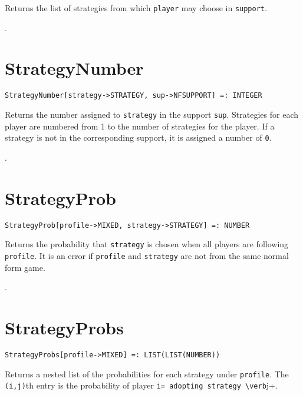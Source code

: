 \noindent
Returns the list of strategies from which  \verb+player+ may choose
in \verb+support+.

\seealso {}.


\section*{StrategyNumber}\label{PrimStrategyNumber}
\begin{verbatim}
StrategyNumber[strategy->STRATEGY, sup->NFSUPPORT] =: INTEGER
\end{verbatim}

\noindent
Returns the number assigned to \verb+strategy+ in the support
\verb+sup+.  Strategies  for each player are numbered from 1 to
the number of strategies for the player.  If a strategy is not in
the corresponding support, it is assigned a number of
\verb+0+.

\seealso {}.


\section*{StrategyProb}\label{PrimStrategyProb}
\begin{verbatim}
StrategyProb[profile->MIXED, strategy->STRATEGY] =: NUMBER 
\end{verbatim}

\noindent
Returns the probability that \verb+strategy+ is chosen when all
players are following \verb+profile+.  It is an error if \verb+profile+
and \verb+strategy+ are not from the same normal form game.

\seealso {}.


\section*{StrategyProbs}\label{PrimStrategyProbs}
\begin{verbatim}
StrategyProbs[profile->MIXED] =: LIST(LIST(NUMBER)) 
\end{verbatim}

\noindent
Returns a nested list of the probabilities for each strategy under
\verb+profile+.  The \verb+(i,j)+th entry is the probability of player
\verb+i= adopting strategy \verb+j+.

